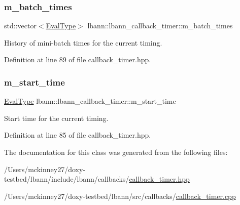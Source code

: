 \subsubsection{\texorpdfstring{m\+\_\+batch\+\_\+times}{m\_batch\_times}}
{\footnotesize\ttfamily std\+::vector$<$\hyperlink{base_8hpp_a3266f5ac18504bbadea983c109566867}{Eval\+Type}$>$ lbann\+::lbann\+\_\+callback\+\_\+timer\+::m\+\_\+batch\+\_\+times\hspace{0.3cm}{\ttfamily [private]}}

History of mini-\/batch times for the current timing. 

Definition at line 89 of file callback\+\_\+timer.\+hpp.

\mbox{\label{classlbann_1_1lbann__callback__timer_a5e65e92eadce733120772d420ffbb7d5}} 
\subsubsection{\texorpdfstring{m\+\_\+start\+\_\+time}{m\_start\_time}}
{\footnotesize\ttfamily \hyperlink{base_8hpp_a3266f5ac18504bbadea983c109566867}{Eval\+Type} lbann\+::lbann\+\_\+callback\+\_\+timer\+::m\+\_\+start\+\_\+time\hspace{0.3cm}{\ttfamily [private]}}

Start time for the current timing. 

Definition at line 85 of file callback\+\_\+timer.\+hpp.



The documentation for this class was generated from the following files\+:\begin{DoxyCompactItemize}
\item 
/\+Users/mckinney27/doxy-\/testbed/lbann/include/lbann/callbacks/\hyperlink{callback__timer_8hpp}{callback\+\_\+timer.\+hpp}\item 
/\+Users/mckinney27/doxy-\/testbed/lbann/src/callbacks/\hyperlink{callback__timer_8cpp}{callback\+\_\+timer.\+cpp}\end{DoxyCompactItemize}

